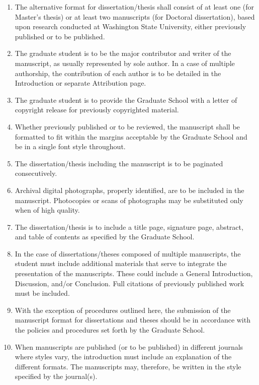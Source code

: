 \begin{enumerate}

    \item The alternative format for dissertation/thesis shall consist of at least one (for Master’s thesis) or at least two manuscripts (for Doctoral dissertation), based upon research conducted at Washington State University, either previously published or to be published.

    \item The graduate student is to be the major contributor and writer of the manuscript, as usually represented by sole author. In a case of multiple authorship, the contribution of each author is to be detailed in the Introduction or separate Attribution page.

    \item The graduate student is to provide the Graduate School with a letter of copyright release for previously copyrighted material.

    \item Whether previously published or to be reviewed, the manuscript shall be formatted to fit within the margins acceptable by the Graduate School and be in a single font style throughout.

    \item The dissertation/thesis including the manuscript is to be paginated consecutively.

    \item Archival digital photographs, properly identified, are to be included in the manuscript. Photocopies or scans of photographs may be substituted only when of high quality.

    \item The dissertation/thesis is to include a title page, signature page, abstract, and table of contents as specified by the Graduate School.

    \item In the case of dissertations/theses composed of multiple manuscripts, the student must include additional materials that serve to integrate the presentation of the manuscripts. These could include a General Introduction, Discussion, and/or Conclusion. Full citations of previously published work must be included.

    \item With the exception of procedures outlined here, the submission of the manuscript format for dissertations and theses should be in accordance with the policies and procedures set forth by the Graduate School.

    \item When manuscripts are published (or to be published) in different journals where styles vary, the introduction must include an explanation of the different formats. The manuscripts may, therefore, be written in the style specified by the journal(s).

\end{enumerate}
